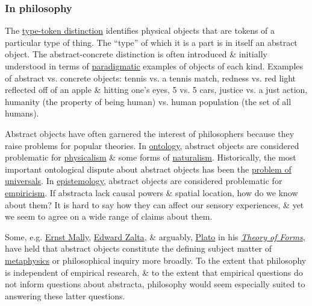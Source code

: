 \documentclass{article}
\begin{document}
\subsubsection{In philosophy}
The \href{https://en.wikipedia.org/wiki/Type%E2%80%93token_distinction}{type-token distinction} identifies physical objects that are tokens of a particular type of thing. The ``type'' of which it is a part is in itself an abstract object. The abstract-concrete distinction is often introduced \& initially understood in terms of \href{https://en.wikipedia.org/wiki/Paradigm}{paradigmatic} examples of objects of each kind. Examples of abstract vs. concrete objects: tennis vs. a tennis match, redness vs. red light reflected off of an apple \& hitting one's eyes, 5 vs. 5 cars, justice vs. a just action, humanity (the property of being human) vs. human population (the set of all humans).

Abstract objects have often garnered the interest of philosophers because they raise problems for popular theories. In \href{https://en.wikipedia.org/wiki/Ontology}{ontology}, abstract objects are considered problematic for \href{https://en.wikipedia.org/wiki/Physicalism}{physicalism} \& some forms of \href{https://en.wikipedia.org/wiki/Metaphysical_naturalism}{naturalism}. Historically, the most important ontological dispute about abstract objects has been the \href{https://en.wikipedia.org/wiki/Problem_of_universals}{problem of universals}. In \href{https://en.wikipedia.org/wiki/Epistemology}{epistemology}, abstract objects are considered problematic for \href{https://en.wikipedia.org/wiki/Empiricism}{empiricism}. If abstracta lack causal powers \& spatial location, how do we know about them? It is hard to say how they can affect our sensory experiences, \& yet we seem to agree on a wide range of claims about them.

Some, e.g. \href{https://en.wikipedia.org/wiki/Ernst_Mally}{\sc Ernst Mally}, \href{https://en.wikipedia.org/wiki/Edward_Zalta}{\sc Edward Zalta}, \& arguably, \href{https://en.wikipedia.org/wiki/Plato}{\sc Plato} in his \href{https://en.wikipedia.org/wiki/Theory_of_Forms}{\it Theory of Forms}, have held that abstract objects constitute the defining subject matter of \href{https://en.wikipedia.org/wiki/Metaphysics}{metaphysics} or philosophical inquiry more broadly. To the extent that philosophy is independent of empirical research, \& to the extent that empirical questions do not inform questions about abstracta, philosophy would seem especially suited to answering these latter questions.
\end{document}
